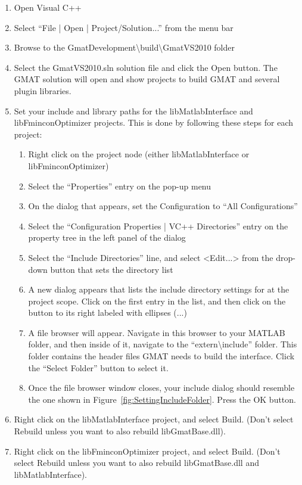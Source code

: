 \documentclass[letterpaper,10pt]{article}%
\begin{document}
\begin{enumerate}
\item Open Visual C++
\item Select ``File | Open | Project/Solution...'' from the menu bar
\item Browse to the GmatDevelopment\textbackslash build\textbackslash GmatVS2010 folder
\item Select the GmatVS2010.sln solution file and click the Open button.  The GMAT solution will open and show projects to build GMAT and several plugin libraries.
\item Set your include and library paths for the libMatlabInterface and libFminconOptimizer projects.  This is done by following these steps for each project:
\begin{enumerate}
\item Right click on the project node (either libMatlabInterface or libFminconOptimizer)
\item Select the ``Properties'' entry on the pop-up menu
\item On the dialog that appears, set the Configuration to ``All Configurations''
\item Select the ``Configuration Properties | VC++ Directories'' entry on the property tree in the left panel of the dialog
\item Select the ``Include Directories'' line, and select <Edit...> from the drop-down button that sets the directory list
\item A new dialog appears that lists the include directory settings for at the project scope.  Click on the first entry in the list, and then click on the button to its right labeled with ellipses (...)
\item A file browser will appear.  Navigate in this browser to your MATLAB folder, and then inside of it, navigate to the ``extern\textbackslash include'' folder.  This folder contains the header files GMAT needs to build the interface.  Click the ``Select Folder'' button to select it.  
\item Once the file browser window closes, your include dialog should resemble the one shown in Figure~\ref{fig:SettingIncludeFolder}.  Press the OK button.
\end{enumerate}
\item Right click on the libMatlabInterface project, and select Build.  (Don't select Rebuild unless you want to also rebuild libGmatBase.dll).
\item Right click on the libFminconOptimizer project, and select Build.  (Don't select Rebuild unless you want to also rebuild libGmatBase.dll and libMatlabInterface).

\end{enumerate}
\end{document}
